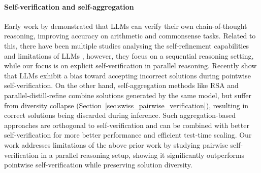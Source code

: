 \paragraph{Self-verification and self-aggregation}
Early work by \citet{weng2023selfverification} demonstrated that LLMs can verify their own chain-of-thought reasoning, improving accuracy on arithmetic and commonsense tasks. Related to this, there have been multiple studies analysing the self-refinement capabilities and limitations of LLMs \citep{madaan2023selfrefine, stechly2025on, huang2024large}, however, they focus on a sequential reasoning setting, while our focus is on explicit self-verification in parallel reasoning. Recently \citet{lu2025doesverificationpayoff} show that LLMs exhibit a bias toward accepting incorrect solutions during pointwise self-verification. On the other hand, self-aggregation methods like RSA \citep{venkatraman2025recursiveselfaggregationunlocksdeep} and parallel-distill-refine \citep{madaan2025rethinkingthinkingtokensllms} combine solutions generated by the same model, but suffer from diversity collapse (Section~\ref{sec:swiss_pairwise_verification}), resulting in correct solutions being discarded during inference. Such aggregation-based approaches are orthogonal to self-verification and can be combined with better self-verification for more better performance and efficient test-time scaling. Our work addresses limitations of the above prior work by studying pairwise self-verification in a parallel reasoning setup, showing it significantly outperforms pointwise self-verification while preserving solution diversity.

